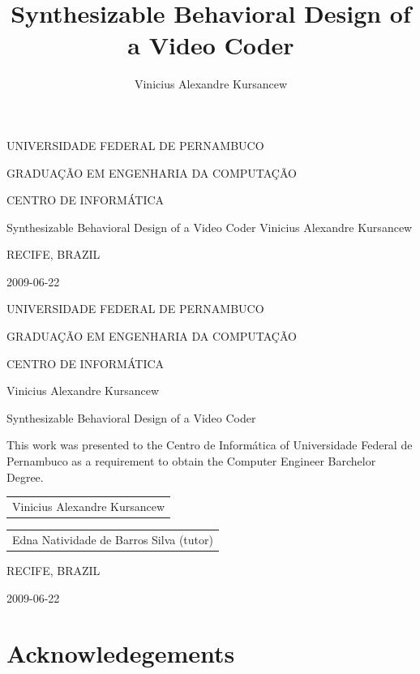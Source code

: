 \documentclass[a4paper, 12pt]{article}
\title{Synthesizable Behavioral Design of a Video Coder}
\author{Vinicius Alexandre Kursancew}
\begin{document}
UNIVERSIDADE FEDERAL DE PERNAMBUCO

GRADUA\c{C}\~{A}O EM ENGENHARIA DA COMPUTA\c{C}\~{A}O

CENTRO DE INFORM\'{A}TICA

\vspace{5cm}

\begin{center}
{\LARGE Synthesizable Behavioral Design of a Video Coder}
\vspace{1cm}
{\Large Vinicius Alexandre Kursancew}
\vspace{13cm}

RECIFE, BRAZIL

2009-06-22
\end{center}

\pagebreak
UNIVERSIDADE FEDERAL DE PERNAMBUCO

GRADUA\c{C}\~{A}O EM ENGENHARIA DA COMPUTA\c{C}\~{A}O

CENTRO DE INFORM\'{A}TICA

\vspace{5cm}
\begin{center}
{\large Vinicius Alexandre Kursancew}

\vspace{1cm}
{\LARGE Synthesizable Behavioral Design of a Video Coder}

\vspace{2cm}
This work was presented to the Centro de Informática of Universidade Federal de Pernambuco as a requirement to obtain the Computer Engineer Barchelor Degree.
\vspace{4cm}

\begin{tabular}{c}
\hline 
Vinicius Alexandre Kursancew \\
\end{tabular}
\vspace{3cm}

\begin{tabular}{c}
\hline 
Edna Natividade de Barros Silva (tutor) \\
\end{tabular}
\vspace{2cm}

RECIFE, BRAZIL

2009-06-22
\end{center}

\pagebreak


\section*{Acknowledegements}
\end{document}
